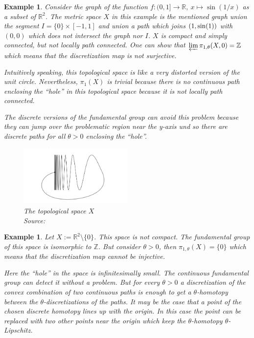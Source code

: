 \documentclass[a4paper, 11pt, twoside]{article}
\newcommand{\R}[0]{\mathbb{R}}
\theoremstyle{break}
\theoremstyle{break}
\newtheorem{ex}[thm]{Example}
\begin{document}
\begin{ex}
  Consider the graph of the function $f\colon (0, 1] \to \R, \: x \mapsto \sin(1/x)$ as a subset of $\R^2$. 
  The metric space $X$ in this example is the mentioned graph union the segment $I = \{0\} \times [-1, 1]$ and union a path which joins $(1, {\rm sin}(1))$ with $(0, 0)$ 
  which does not intersect the graph nor $I$.
  $X$ is compact and simply connected, but not locally path connected.
  One can show that $\varprojlim \pi_{1,\theta}(X, 0) = \mathbb{Z}$ which means that the discretization map is not surjective.

  Intuitively speaking, this topological space is like a very distorted version of the unit circle. 
  Nevertheless, $\pi_1(X)$ is trivial because there is no continuous path enclosing the ``hole'' in this topological space because it is not locally path connected.
  
  The discrete versions of the fundamental group can avoid this problem because they can jump over the problematic region near the y-axis und so there are discrete paths for all 
  $\theta > 0$ enclosing the ``hole''.
  
  \begin{figure}[ht!]
    \centering
    \includegraphics[width=0.5\textwidth]{ex1.png}
    \caption{The topological space $X$ \\ Source: \cite[p. 8]{vigolo2018fundamental}}
  \end{figure}
\end{ex}

\begin{ex}
  Let $X := \R^2 \setminus \{0\}$. This space is not compact. The fundamental group of this space is isomorphic to $\mathbb{Z}$. 
  But consider $\theta > 0$, then $\pi_{1,\theta}(X) = \{0\}$ which means that the discretization map cannot be injective.

  Here the ``hole'' in the space is infinitesimally small. The continuous fundamental group can detect it without a problem. 
  But for every $\theta > 0$ a discretization of the convex combination of two continuous paths is enough to get a $\theta$-homotopy between the 
  $\theta$-discretizations of the paths.
  It may be the case that a point of the chosen discrete homotopy lines up with the origin.
  In this case the point can be replaced with two other points near the origin which keep the $\theta$-homotopy $\theta$-Lipschitz.  
\end{ex}

\clearpage


\end{document}
